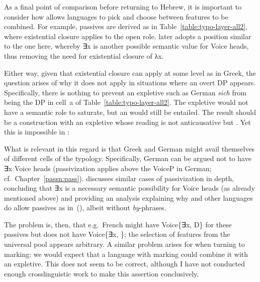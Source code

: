 \begin{exe}
\begin{xlist}
\begin{exe}
\begin{exe}
\begin{xlist}
\begin{exe}
\begin{exe}
\begin{exe}
\begin{exe}
\begin{exe}
\begin{xlist}
As a final point of comparison before returning to Hebrew, it is important to consider how  allows languages to pick and choose between features to be combined. For example,  passives are derived as in Table~\ref{table:typo-layer-all2}, where existential closure applies to the open  role. \cite{schaefer17oup} later adopts a position similar to the one here, whereby ∃x is another possible semantic value for Voice heads, thus removing the need for existential closure of λx. 

Either way, given that existential closure can apply at some level as in Greek, the question arises of why it does not apply in situations where an overt DP appears. Specifically, there is nothing to prevent an expletive such as German \emph{sich} from being the DP in cell~a of Table~\ref{table:typo-layer-all2}. The expletive would not have a semantic role to saturate, but an  would still be entailed. The result should be a construction with an expletive whose reading is not anticausative but . Yet this is impossible in :
 \begin{exe}
	
 \z 

What is relevant in this regard is that Greek and German might avail themselves of different cells of the typology. Specifically, German can be argued not to have ∃x Voice heads (passivization applies above the VoiceP in German; cf.~Chapter~\ref{passn:pass}). \cite{schaefer17oup} discusses similar cases of passivization in depth, concluding that ∃x is a necessary semantic possibility for Voice heads (as already mentioned above) and providing an analysis explaining why  and other languages do allow passives as in~(\lastx), albeit without \emph{by}-phrases. 

The problem is, then, that e.g.~French might have Voice\{∃x, D\} for these passives but does not have Voice\{∃x, \zero\}; the selection of features from the universal pool appears arbitrary. A similar problem arises for  when turning to  marking: we would expect that a language with  marking could combine it with an expletive. This does not seem to be correct, although I have not conducted enough crosslinguistic work to make this assertion conclusively. 


\end{exe}
\end{xlist}
\end{exe}
\end{exe}
\end{exe}
\end{exe}
\end{exe}
\end{xlist}
\end{exe}
\end{exe}
\end{xlist}
\end{exe}
